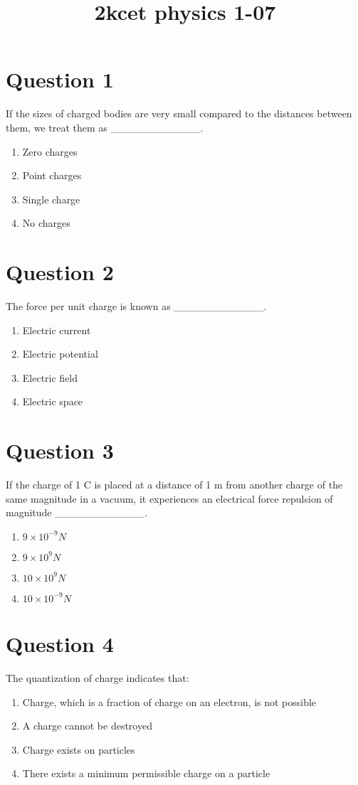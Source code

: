 \documentclass{article}
\title{2kcet physics 1-07}
\begin{document}
                    \maketitle
                    \section*{Question 1}
If the sizes of charged bodies are very small compared to the distances between them, we treat them as ____________.
\begin{enumerate}[label=(\alph*)]
\item Zero charges
\item Point charges
\item Single charge
\item No charges
\end{enumerate}
\newpage
\section*{Question 2}
The force per unit charge is known as ____________.
\begin{enumerate}[label=(\alph*)]
\item Electric current
\item Electric potential
\item Electric field
\item Electric space
\end{enumerate}
\newpage
\section*{Question 3}
If the charge of 1 C is placed at a distance of 1 m from another charge of the same magnitude in a vacuum, it experiences an electrical force repulsion of magnitude ____________.
\begin{enumerate}[label=(\alph*)]
\item \(9 \times 10^{-9} N\)
\item \(9 \times 10^9 N\)
\item \(10 \times 10^9 N\)
\item \(10 \times 10^{-9} N\)
\end{enumerate}
\newpage
\section*{Question 4}
The quantization of charge indicates that:
\begin{enumerate}[label=(\alph*)]
\item Charge, which is a fraction of charge on an electron, is not possible
\item A charge cannot be destroyed
\item Charge exists on particles
\item There exists a minimum permissible charge on a particle
\end{enumerate}
\newpage
\end{document}
